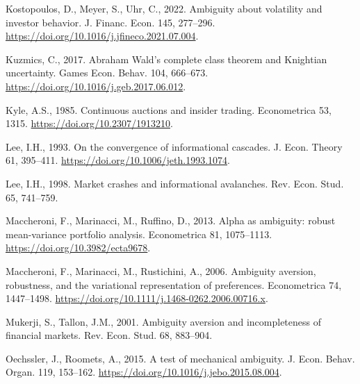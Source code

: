 \documentclass[12pt,a4paper]{article}
\newenvironment{biblock}{%
  \par\vspace{2pt}\noindent\small%
  \ignorespaces
}{%
  \par\vspace{2pt}%
}
\begin{document}
\begin{biblock}
Kostopoulos, D., Meyer, S., Uhr, C., 2022. Ambiguity about volatility and investor behavior. J. Financ. Econ. 145, 277--296. \url{https://doi.org/10.1016/j.jfineco.2021.07.004}.
\end{biblock}

\begin{biblock}
Kuzmics, C., 2017. Abraham Wald's complete class theorem and Knightian uncertainty. Games Econ. Behav. 104, 666--673. \url{https://doi.org/10.1016/j.geb.2017.06.012}.
\end{biblock}

\begin{biblock}
Kyle, A.S., 1985. Continuous auctions and insider trading. Econometrica 53, 1315. \url{https://doi.org/10.2307/1913210}.
\end{biblock}

\begin{biblock}
Lee, I.H., 1993. On the convergence of informational cascades. J. Econ. Theory 61, 395--411. \url{https://doi.org/10.1006/jeth.1993.1074}.
\end{biblock}

\begin{biblock}
Lee, I.H., 1998. Market crashes and informational avalanches. Rev. Econ. Stud. 65, 741--759.
\end{biblock}

\begin{biblock}
Maccheroni, F., Marinacci, M., Ruffino, D., 2013. Alpha as ambiguity: robust mean-variance portfolio analysis. Econometrica 81, 1075--1113. \url{https://doi.org/10.3982/ecta9678}.
\end{biblock}

\begin{biblock}
Maccheroni, F., Marinacci, M., Rustichini, A., 2006. Ambiguity aversion, robustness, and the variational representation of preferences. Econometrica 74, 1447--1498. \url{https://doi.org/10.1111/j.1468-0262.2006.00716.x}.
\end{biblock}

\begin{biblock}
Mukerji, S., Tallon, J.M., 2001. Ambiguity aversion and incompleteness of financial markets. Rev. Econ. Stud. 68, 883--904.
\end{biblock}

\begin{biblock}
Oechssler, J., Roomets, A., 2015. A test of mechanical ambiguity. J. Econ. Behav. Organ. 119, 153--162. \url{https://doi.org/10.1016/j.jebo.2015.08.004}.
\end{biblock}
\end{document}
